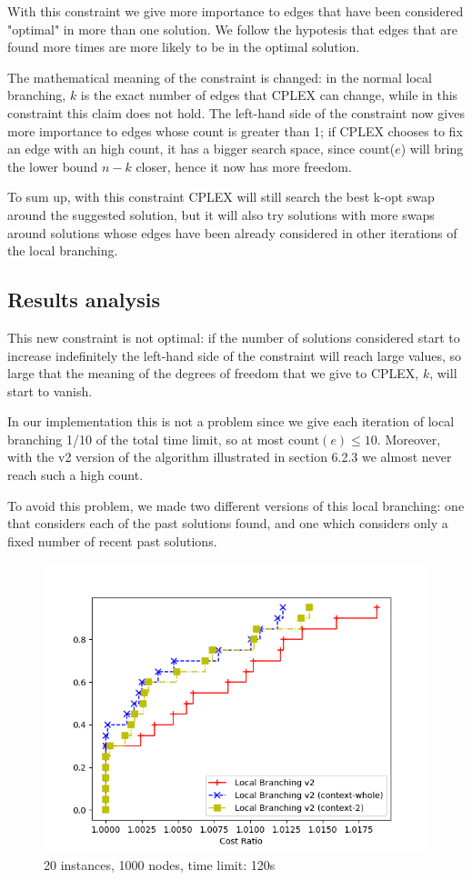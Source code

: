 With this constraint we give more importance to edges that have been considered "optimal" in more than one solution. We follow the hypotesis that edges that are found more times are more likely to be in the optimal solution.

The mathematical meaning of the constraint is changed: in the normal local branching, $k$ is the exact number of edges that CPLEX can change, while in this constraint this claim does not hold. The left-hand side of the constraint now gives more importance to edges whose count is greater than 1; if CPLEX chooses to fix an edge with an high count, it has a bigger search space, since count($e$) will bring the lower bound $n-k$ closer, hence it now has more freedom.

To sum up, with this constraint CPLEX will still search the best k-opt swap around the suggested solution, but it will also try solutions with more swaps around solutions whose edges have been already considered in other iterations of the local branching.

\subsection{Results analysis}

This new constraint is not optimal: if the number of solutions considered start to increase indefinitely the left-hand side of the constraint will reach large values, so large that the meaning of the degrees of freedom that we give to CPLEX, $k$, will start to vanish.

In our implementation this is not a problem since we give each iteration of local branching 1/10 of the total time limit, so at most $\text{count}(e)\leq10$. Moreover, with the v2 version of the algorithm illustrated in section 6.2.3 we almost never reach such a high count.

To avoid this problem, we made two different versions of this local branching: one that considers each of the past solutions found, and one which considers only a fixed number of recent past solutions.

\begin{figure}[h]
    \centering
    \includegraphics*[width=.6\textwidth]{../plots/perfprof_lbv2_costs.png}
    \caption*{20 instances, 1000 nodes, time limit: 120s}
\end{figure}


